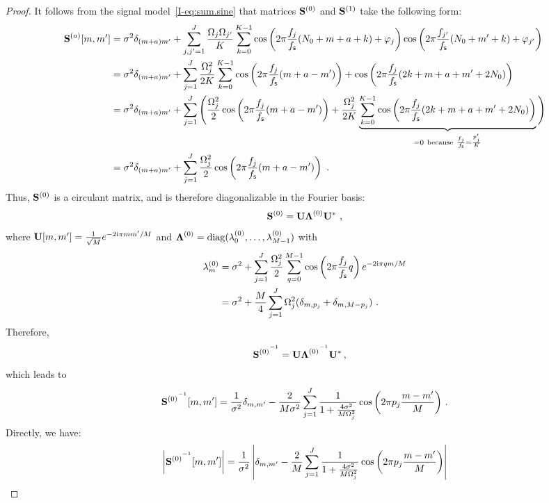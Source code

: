 \documentclass[journal,onecolumn]{IEEEtran}
\begin{document}
\begin{proof}
It follows from the signal model~\eqref{I-eq:sum.sine} that matrices ${\mathbf S}^{(0)}$ and ${\mathbf S}^{(1)}$ take the following form:
\begin{align}
\nonumber
\bS^{(a)}[m,m'] &= \sigma^2\delta_{(m+a)m'}+\sum_{j,j'=1}^J\dfrac{\Omega_j\Omega_{j'}}{K}\sum_{k=0}^{K-1} \cos\left(2\pi \frac{f_j}{\fs}(N_0+m+a+k)+\varphi_j\right)\cos\left(2\pi \frac{f_{j'}}{\fs}(N_0+m'+k)+\varphi_{j'}\right) \\
\nonumber
&= \sigma^2\delta_{(m+a)m'}+\sum_{j=1}^J\dfrac{\Omega_j^2}{2K}\sum_{k=0}^{K-1} \cos\left(2\pi \frac{f_j}{\fs}(m+a-m')\right) + \cos\left(2\pi \frac{f_j}{\fs}(2k+m+a+m'+2N_0)\right)\\
\nonumber
&= \sigma^2\delta_{(m+a)m'}+\sum_{j=1}^J\Bigg( \dfrac{\Omega_j^2}2\cos\left(2\pi \frac{f_j}{\fs}(m+a-m')\right) + \dfrac{\Omega_j^2}{2K}\underbrace{\sum_{k=0}^{K-1}\cos\left(2\pi \frac{f_j}{\fs}(2k+m+a+m'+2N_0)\right)}_{=0\ \mathrm{because}\ \frac{f_j}\fs=\frac{p'_j}K } \Bigg)\\
&= \sigma^2\delta_{(m+a)m'}+\sum_{j=1}^J\dfrac{\Omega_j^2}2\cos\left(2\pi \frac{f_j}{\fs}(m+a-m')\right)\ .
\label{eq:S1}
\end{align}
Thus, ${\mathbf S}^{(0)}$ is a circulant matrix, and is therefore diagonalizable in the Fourier basis:
\[
{\mathbf S}^{(0)} = {\mathbf U}\boldsymbol{\Lambda}^{(0)}{\mathbf U}^*\ ,
\]
where ${\mathbf U}[m,m']=\frac1{\sqrt{M}}e^{-2\mathrm{i}\pi mm'/M}$ and $\boldsymbol{\Lambda}^{(0)} = \mathrm{diag}(\lambda_0^{(0)},\dots,\lambda_{M-1}^{(0)})$ with
\begin{align*}
\lambda_m^{(0)} &= \sigma^2 + \sum_{j=1}^J\dfrac{\Omega_j^2}2\sum_{q=0}^{M-1} \cos\left(2\pi\frac{f_j}{f_{\mathsf s}} q\right) e^{-2\mathrm{i}\pi qm/M} \\
&= \sigma^2 + \dfrac{M}{4}\sum_{j=1}^J\Omega_j^2(\delta_{m,p_j} + \delta_{m,M-p_j})\ .
\end{align*}
Therefore,
\begin{align*}
{{\mathbf S}^{(0)}}^{^{-1}}  &= {\mathbf U}{\boldsymbol{\Lambda}^{(0)}}^{^{-1}}{\mathbf U}^*\,,
\end{align*}
which leads to
\begin{equation*}
{{\mathbf S}^{(0)}}^{^{-1}}[m,m']  = \dfrac1{\sigma^2}\delta_{m,m'}-\dfrac{2}{M\sigma^2}\sum_{j=1}^J\dfrac{1}{1+\frac{4\sigma^2}{M\Omega_j^2}}\cos\left(2\pi p_j \dfrac{m-m'}{M}\right)\,.
\end{equation*}
Directly, we have:
\begin{align*}
\left|{\bS^{(0)}}^\inv[m,m']\right|  &= \dfrac1{\sigma^2}\left|\delta_{m,m'}-\dfrac{2}{M}\sum_{j=1}^J\dfrac{1}{1+\frac{4\sigma^2}{M\Omega_j^2}}\cos\left(2\pi p_j \dfrac{m-m'}{M}\right)\right| \\

\end{align*}
\end{proof}
\end{document}

